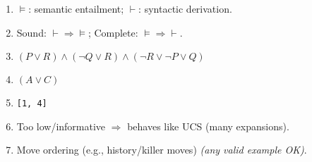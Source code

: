 \documentclass[11pt]{article}
\begin{document}
\begin{enumerate}[left=0em,itemsep=0.25em]
\item $\models$: semantic entailment; $\vdash$: syntactic derivation.
\item Sound: $\vdash \Rightarrow \models$; Complete: $\models \Rightarrow \vdash$.
\item $(P\vee R)\wedge(\neg Q\vee R)\wedge(\neg R\vee \neg P\vee Q)$
\item $(A \vee C)$
\item \verb|[1, 4]|
\item Too low/informative $\Rightarrow$ behaves like UCS (many expansions).
\item Move ordering (e.g., history/killer moves) \textit{(any valid example OK)}.
\end{enumerate}
\fi
\end{document}
